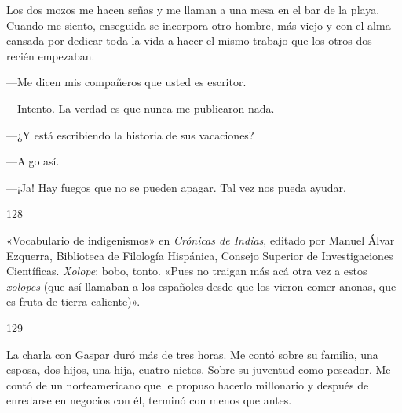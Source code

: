 \documentclass[12pt,twoside,openright,a5paper]{book}
\begin{document}
\nopagebreak

Los dos mozos me hacen señas y me llaman a una mesa en el bar de la
playa. Cuando me siento, enseguida se incorpora otro hombre, más viejo
y con el alma cansada por dedicar toda la vida a hacer el mismo trabajo
que los otros dos recién empezaban.

---Me dicen mis compañeros que usted es escritor.

---Intento. La verdad es que nunca me publicaron nada.

---¿Y está escribiendo la historia de sus vacaciones?

---Algo así.

---¡Ja! Hay fuegos que no se pueden apagar. Tal vez nos pueda ayudar.


\vspace{0.5cm}

\hrulefill \hspace{0.1cm}\decofourleft\hspace{0.2cm} 128 \hspace{0.2cm}\decofourright \hspace{0.1cm}\hrulefill

\nopagebreak

\vspace{0.5cm}

\nopagebreak

«Vocabulario de indigenismos» en \emph{Crónicas de Indias}, editado por Manuel
Álvar Ezquerra, Biblioteca de Filología Hispánica, Consejo Superior de
Investigaciones Científicas. \emph{Xolope}: bobo, tonto. «Pues no traigan más
acá otra vez a estos \emph{xolopes} (que así llamaban a los españoles desde
que los vieron comer anonas, que es fruta de tierra caliente)».

\vspace{0.5cm}

\hrulefill \hspace{0.1cm}\decofourleft\hspace{0.2cm} 129 \hspace{0.2cm}\decofourright \hspace{0.1cm}\hrulefill

\nopagebreak

\vspace{0.5cm}

\nopagebreak

La charla con Gaspar duró más de tres horas. Me contó sobre su familia,
una esposa, dos hijos, una hija, cuatro nietos. Sobre su juventud como
pescador. Me contó de un norteamericano que le propuso hacerlo millonario
y después de enredarse en negocios con él, terminó con menos que antes.
\end{document}

